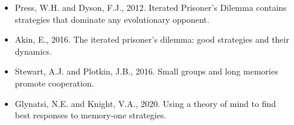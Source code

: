 \documentclass{beamer}
\def\checkmark{\tikz\fill[scale=0.4](0,.35) -- (.25,0) -- (1,.7) -- (.25,.15) -- cycle;}
\begin{document}

\begin{frame}
    \centering
    
\end{frame}

\begin{frame}
    \begin{center}
    \begin{columns}
        \begin{column}{.3\textwidth}
            \centering
            
        \end{column}
        \pause
        \begin{column}{.7\textwidth}
            \begin{itemize}
                \item Press, W.H. and Dyson, F.J., 2012. Iterated Prisoner's Dilemma contains strategies that dominate any evolutionary opponent.
                \item Akin, E., 2016. The iterated prisoner's dilemma: good strategies and their dynamics.
                \item Stewart, A.J. and Plotkin, J.B., 2016. Small groups and long memories promote cooperation.
                \item Glynatsi, N.E. and Knight, V.A., 2020. Using a theory of mind to find best responses to memory-one strategies. 
            \end{itemize}
        \end{column}
    \end{columns}
    \end{center}
\end{frame}
\end{document}
